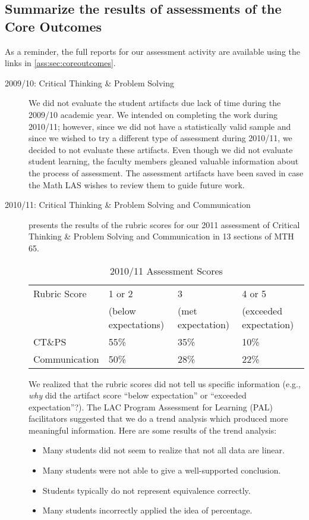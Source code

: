 \subsection{Summarize the results of assessments of the Core Outcomes}
As a reminder, the full reports for our assessment activity are available using the links in \cref{ass:sec:coreoutcomes}.


\begin{description}
\item[2009/10: Critical Thinking \& Problem Solving]
We did not evaluate the student artifacts due lack of time during the 2009/10 academic year. We intended on completing the work during 2010/11; however, since we did not have a statistically valid sample and since we wished to try a different type of assessment during 2010/11, we decided to not evaluate these artifacts.  Even though we did not evaluate student learning, the faculty members gleaned valuable information about the process of assessment. The assessment artifacts have been saved in case the Math LAS wishes to review them to guide future work.
\item[2010/11:  Critical Thinking \& Problem Solving and Communication]
 presents the results of the rubric scores for our 2011 assessment of Critical Thinking \& Problem Solving and Communication in 13 sections of MTH 65.
\begin{table}[!htb]
\centering
\caption{2010/11 Assessment Scores}\label{ass:tab:201011scores}
\begin{tabular}{llll}
\toprule
Rubric Score & 1 or 2 & 3 & 4 or 5\\
&(below expectations)&(met expectation)&(exceeded expectation)\\
\midrule
CT\&PS &55\%&35\%&10\%\\
Communication &50\%&28\%&22\%\\
\bottomrule
\end{tabular}
\end{table}

We realized that the rubric scores did not tell us specific information (e.g., \emph{why} did the artifact score ``below expectation'' or ``exceeded expectation''?).  The LAC Program Assessment for Learning (PAL) facilitators suggested that we do a trend analysis which produced more meaningful information. Here are some results of the trend analysis:
\begin{itemize}
\item Many students did not seem to realize that not all data are linear.
\item Many students were not able to give a well-supported conclusion.
\item Students typically do not represent equivalence correctly.
\item Many students incorrectly applied the idea of percentage.
\end{itemize}


\end{description}
